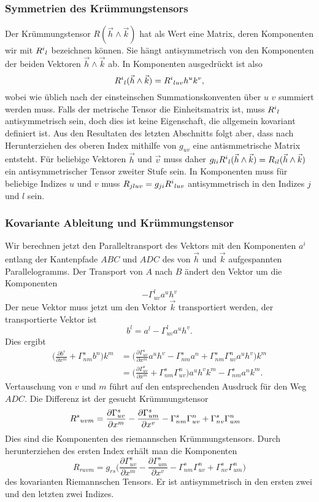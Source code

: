 \subsubsection{Symmetrien des Krümmungstensors}
Der Krümmungstensor $R(\vec{h}\wedge\vec{k})$ hat als Wert eine Matrix,
deren Komponenten wir mit $R^i\mathstrut_l$ bezeichnen können.
Sie hängt antisymmetrisch von den Komponenten der beiden Vektoren
$\vec{h}\wedge\vec{k}$ ab.
In Komponenten ausgedrückt ist also
\[
R^i\mathstrut_l(\vec{h}\wedge\vec{k})
=
R^i\mathstrut_{luv} h^uk^v,
\]
wobei wie üblich nach der einsteinschen Summationskonventen über $u$
$v$ summiert werden muss.
Falls der metrische Tensor die Einheitsmatrix ist, muss $R^i\mathstrut_l$
antisymmetrisch sein, doch dies ist keine Eigenschaft, die allgemein
kovariant definiert ist.
Aus den Resultaten des letzten Abschnitts folgt aber, dass nach
Herunterziehen des oberen Index mithilfe von $g_{uv}$ eine
antismmetrische Matrix entsteht.
Für beliebige Vektoren $\vec{h}$ und $\vec{v}$ muss daher
$g_{li}R^i\mathstrut_l(\vec{h}\wedge\vec{k})=R_{il}(\vec{h}\wedge\vec{k})$
ein antisymmetrischer Tensor zweiter Stufe sein.
In Komponenten muss für beliebige Indizes $u$ und $v$ muss
$R_{jluv}=g_{ji}R^i\mathstrut_{luv}$ antisymmetrisch in den
Indizes $j$ und $l$ sein.

\subsubsection{Kovariante Ableitung und Krümmungstensor}
Wir berechnen jetzt den Paralleltransport des Vektors mit den
Komponenten $a^i$ entlang der Kantenpfade $ABC$ und $ADC$ 
des von $\vec{h}$ und $\vec{k}$ aufgespannten Parallelogramms.
Der Transport von $A$ nach $B$ ändert den Vektor um die Komponenten
\[
-\Gamma^l_{uv} a^u h^v 
\]
Der neue Vektor muss jetzt um den Vektor $\vec{k}$ transportiert
werden, der transportierte Vektor ist
\[
b^l
=
a^l-\Gamma^l_{uv} a^u h^v.
\]
Dies ergibt
\begin{align*}
\biggl(
\frac{\partial b^s}{\partial x^m}
+
\Gamma^s_{nm} b^n
\biggr)
k^m
&=
\biggl(
\frac{\partial \Gamma^s_{uv}}{\partial x^m}
a^u
h^v
-
\Gamma^s_{nm}
a^n
+
\Gamma^s_{nm} \Gamma^n_{uv}
a^u
h^v
\biggr)
k^m
\\
&=
\biggl(
\frac{\partial \Gamma^s_{uv}}{\partial x^m}
+
\Gamma^s_{nm}\Gamma^n_{uv}
\biggr)
a^u
h^v k^m
-
\Gamma^s_{nm}a^nk^m.
\end{align*}
Vertauschung von $v$ und $m$ führt auf den entsprechenden
Ausdruck für den Weg $ADC$.
Die Differenz ist der gesucht Krümmungstensor
\begin{align*}
R^s\mathstrut_{uvm}
&=
\frac{\partial\Gamma^s_{uv}}{\partial x^m}
-
\frac{\partial\Gamma^s_{um}}{\partial x^v}
-
\Gamma^s_{nm}\Gamma^n_{uv}
+
\Gamma^s_{nv}\Gamma^n_{um}
\end{align*}
Dies sind die Komponenten des riemannschen Krümmungstensors.
Durch herunterziehen des ersten Index erhält man die Komponenten
\[
R_{ruvm}
=
g_{rs}
\biggl(
\frac{\partial\Gamma^s_{uv}}{\partial x^m}
-
\frac{\partial\Gamma^s_{um}}{\partial x^v}
-
\Gamma^s_{nm}\Gamma^n_{uv}
+
\Gamma^s_{nv}\Gamma^n_{um}
\biggr)
\]
des kovarianten Riemannschen Tensors.
Er ist antisymmetrisch in den ersten zwei und den letzten zwei
Indizes.

